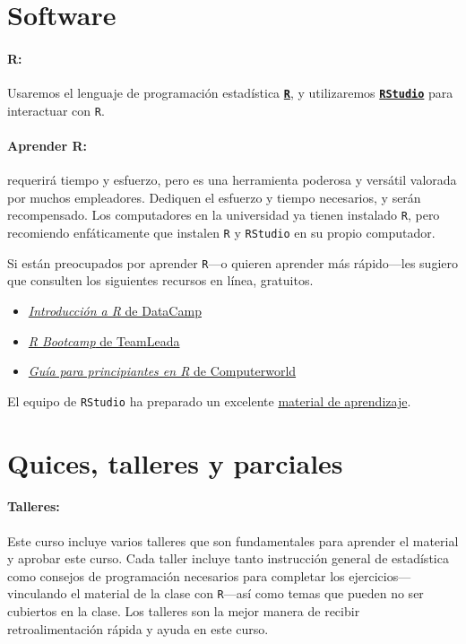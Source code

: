 \documentclass[10pt]{article}
\begin{document}
	\section*{Software}
	
	\paragraph{R:} Usaremos el lenguaje de programación estadística \href{https://www.r-project.org/}{\textbf{\texttt{R}}}, y utilizaremos \href{https://www.rstudio.com}{\textbf{\texttt{RStudio}}} para interactuar con \texttt{R}.
	
	\paragraph{Aprender R:} requerirá tiempo y esfuerzo, pero es una herramienta poderosa y versátil valorada por muchos empleadores. Dediquen el esfuerzo y tiempo necesarios, y serán recompensado. Los computadores en la universidad ya tienen instalado \texttt{R}, pero recomiendo enfáticamente que instalen \texttt{R} y \texttt{RStudio} en su propio computador.
	
	Si están preocupados por aprender \texttt{R}---o quieren aprender más rápido---les sugiero que consulten los siguientes recursos en línea, gratuitos.
	\begin{itemize}
		\item \href{https://www.datacamp.com/courses/free-introduction-to-r}{\textit{Introducción a R} de DataCamp}
		\item \href{https://www.teamleada.com/courses/r-bootcamp}{\textit{R Bootcamp} de TeamLeada}
		\item \href{https://www.computerworld.com/article/2497143/business-intelligence-beginner-s-guide-to-r-introduction.html}{\textit{Guía para principiantes en R} de Computerworld}
	\end{itemize}
	El equipo de \texttt{RStudio} ha preparado un excelente \href{https://education.rstudio.com/learn/beginner/}{material de aprendizaje}.
	
	
	\section*{Quices, talleres y parciales}
	
	\paragraph{Talleres:} Este curso incluye varios talleres que son fundamentales para aprender el material y aprobar este curso. Cada taller incluye tanto instrucción general de estadística como consejos de programación necesarios para completar los ejercicios—vinculando el material de la clase con \texttt{R}—así como temas que pueden no ser cubiertos en la clase. Los talleres son la mejor manera de recibir retroalimentación rápida y ayuda en este curso. 
	
\end{document}
